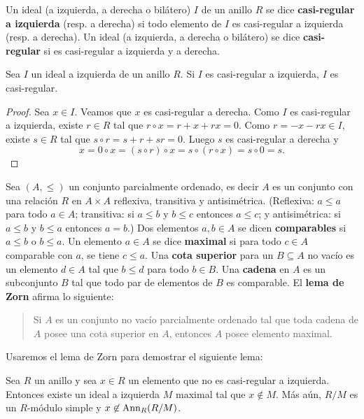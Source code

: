 Un ideal (a izquierda, a derecha o bilátero) $I$ de un anillo $R$ se dice
\textbf{casi-regular a izquierda} (resp. a derecha) si todo elemento de $I$ es
casi-regular a izquierda (resp. a derecha). Un ideal (a izquierda, a derecha o
bilátero) se dice \textbf{casi-regular} si es casi-regular a izquierda y a
derecha. 

\begin{lemma}
	\label{lemma:casiregular}
	Sea $I$ un ideal a izquierda de un anillo $R$. Si $I$ es casi-regular a
	izquierda, $I$ es casi-regular.
\end{lemma}

\begin{proof}
	Sea $x\in I$. Veamos que $x$ es casi-regular a derecha.  Como $I$ es
	casi-regular a izquierda, existe $r\in R$ tal que $r\circ x=r+x+rx=0$. Como
	$r=-x-rx\in I$, existe $s\in R$ tal que $s\circ
	r=s+r+sr=0$. Luego $s$ es casi-regular a derecha y 
	\[
	x=0\circ x=(s\circ r)\circ x=s\circ (r\circ x)=s\circ 0=s.
	\]
\end{proof}

Sea $(A,\leq)$ un conjunto parcialmente ordenado, es decir $A$ es un conjunto
con una relación $R$ en $A\times A$ reflexiva, transitiva y antisimétrica.
(Reflexiva: $a\leq a$ para todo $a\in A$; transitiva: si $a\leq b$ y $b\leq c$
entonces $a\leq c$; y antisimétrica: si $a\leq b$ y $b\leq a$ entonces $a=b$.)
Dos elementos $a,b\in A$ se dicen \textbf{comparables} si $a\leq b$ o $b\leq
a$. Un elemento $a\in A$ se dice \textbf{maximal} si para todo $c\in A$
comparable con $a$, se tiene $c\leq a$. 
Una \textbf{cota superior} para un $B\subseteq A$ no vacío es un elemento $d\in
A$ tal que $b\leq d$ para todo $b\in B$.  Una \textbf{cadena} en $A$ es un
subconjunto $B$ tal que todo par de elementos de $B$ es comparable. 
El \textbf{lema de Zorn} afirma lo siguiente: 
\begin{quote}
Si $A$ es un conjunto no vacío parcialmente ordenado tal que toda cadena de
$A$ posee una cota superior en $A$, entonces $A$ posee elemento maximal.
\end{quote}
Usaremos el lema de Zorn para demostrar el siguiente lema:

\begin{lemma}
	\label{lemma:maxreg}
	Sea $R$ un anillo y sea $x\in R$ un elemento que no es casi-regular a
	izquierda. Entonces existe un ideal a izquierda $M$ maximal tal que
	$x\not\in M$. Más aún, $R/M$ es un $R$-módulo simple y
	$x\not\in\operatorname{Ann}_R(R/M)$.
\end{lemma}

